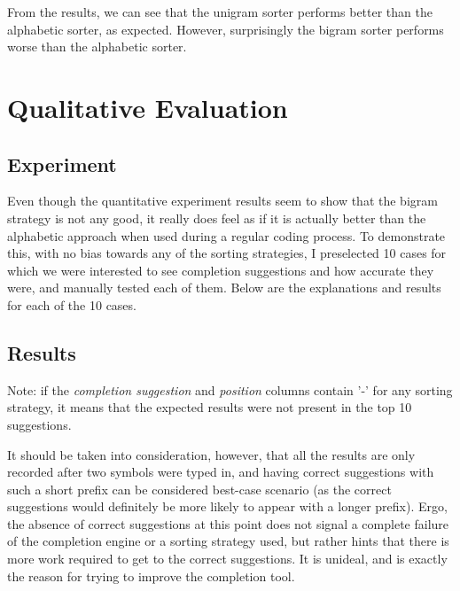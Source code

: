 
From the results, we can see that the unigram sorter performs better than the alphabetic sorter, as expected. However, surprisingly the bigram sorter performs worse than the alphabetic sorter.  

\section{Qualitative Evaluation}
\label{sec:Evaluation-Qualitative}
\subsection{Experiment}
Even though the quantitative experiment results seem to show that the bigram strategy is not any good, it really does feel as if it is actually better than the alphabetic approach when used during a regular coding process. To demonstrate this, with no bias towards any of the sorting strategies, I preselected 10 cases for which we were interested to see completion suggestions and how accurate they were, and manually tested each of them. Below are the explanations and results for each of the 10 cases.

\subsection{Results}
Note: if the \textit{completion suggestion} and \textit{position} columns contain '-' for any sorting strategy, it means that the expected results were not present in the top 10 suggestions.

It should be taken into consideration, however, that all the results are only recorded after two symbols were typed in, and having correct suggestions with such a short prefix can be considered best-case scenario (as the correct suggestions would definitely be more likely to appear with a longer prefix). Ergo, the absence of correct suggestions at this point does not signal a complete failure of the completion engine or a sorting strategy used, but rather hints that there is more work required to get to the correct suggestions. It is unideal, and is exactly the reason for trying to improve the completion tool.

